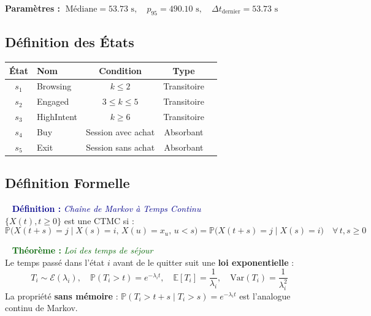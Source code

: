 \documentclass[11pt,a4paper]{article}
\newenvironment{defbox}[1]{%
  \vspace{3pt}\begin{framed}
  \noindent{\color{NavyBlue}\rule{0.3cm}{3pt}}~%
  \textcolor{DarkBlue}{\textbf{Définition :} \textit{#1}}\\[3pt]}
  {\end{framed}\vspace{3pt}}
\newenvironment{thmbox}[1]{%
  \vspace{3pt}\begin{framed}
  \noindent{\color{DarkGreen}\rule{0.3cm}{3pt}}~%
  \textcolor{DarkGreen}{\textbf{Théorème :} \textit{#1}}\\[3pt]}
  {\end{framed}\vspace{3pt}}
\newcommand{\Prob}{\mathbb{P}}
\begin{document}
\begin{resultbox}
\textbf{Paramètres :}
$\;\text{Médiane} = 53.73\text{ s},\quad p_{95} = 490.10\text{ s},\quad \Delta t_{\text{dernier}} = 53.73\text{ s}$
\end{resultbox}

\subsection{Définition des États}

\begin{center}
\begin{tabular}{clccc}
\toprule
\textbf{État} & \textbf{Nom} & \textbf{Condition} & \textbf{Type} \\
\midrule
\rowcolor{LightBlue}   $s_1$ & Browsing   & $k \leq 2$         & Transitoire \\
\rowcolor{LightOrange} $s_2$ & Engaged    & $3 \leq k \leq 5$   & Transitoire \\
\rowcolor{LightRed}    $s_3$ & HighIntent & $k \geq 6$          & Transitoire \\
\rowcolor{LightBuy}    $s_4$ & Buy        & Session avec achat  & Absorbant \\
\rowcolor{LightGray}   $s_5$ & Exit       & Session sans achat  & Absorbant \\
\bottomrule
\end{tabular}
\end{center}

\subsection{Définition Formelle}

\begin{defbox}{Chaîne de Markov à Temps Continu}
$\{X(t), t \geq 0\}$ est une CTMC si :
\[
\Prob\bigl(X(t{+}s){=}j \mid X(s){=}i,\, X(u){=}x_u,\, u{<}s\bigr)
= \Prob\bigl(X(t{+}s){=}j \mid X(s){=}i\bigr)
\quad \forall\, t,s \geq 0
\]
\end{defbox}

\begin{thmbox}{Loi des temps de séjour}
Le temps passé dans l'état $i$ avant de le quitter suit une \textbf{loi exponentielle} :
\[
T_i \sim \mathcal{E}(\lambda_i), \quad
\Prob(T_i > t) = e^{-\lambda_i t}, \quad
\mathbb{E}[T_i] = \frac{1}{\lambda_i}, \quad
\mathrm{Var}(T_i) = \frac{1}{\lambda_i^2}
\]
La propriété \textbf{sans mémoire} : $\Prob(T_i>t{+}s\mid T_i>s)=e^{-\lambda_i t}$
est l'analogue continu de Markov.
\end{thmbox}
\end{document}
